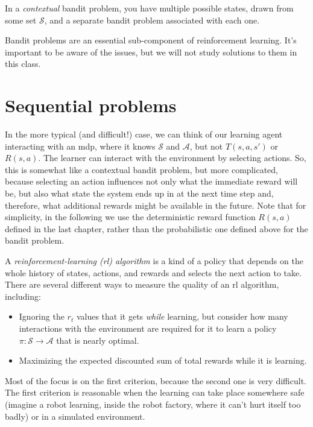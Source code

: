 In a {\em contextual} bandit problem, you have multiple possible
states, drawn from some set $\mathcal S$, and a separate bandit
problem associated with each one.

Bandit problems are an essential sub-component of reinforcement
learning.  It's important to be aware of the issues, but we will not
study solutions to them in this class.

\section{Sequential problems}
\label{rl}
In the more typical (and difficult!) case, we can think of our
learning agent interacting with an {\sc mdp}, where it knows $\mathcal
S$ and $\mathcal A$, but not $T(s,a,s')$ or $R(s,a)$.  The learner can
interact with the environment by selecting actions.  So, this is
somewhat like a contextual bandit problem, but more complicated,
because selecting an action influences not only what the immediate
reward will be, but also what state the system ends up in at the next
time step and, therefore, what additional rewards might be available
in the future.  Note that for simplicity, in the following we use the
deterministic reward function $R(s,a)$ defined in the last chapter,
rather than the probabilistic one defined above for the bandit problem.

A {\em reinforcement-learning ({\sc rl}) algorithm} is a kind of a policy that
depends on the whole history of states, actions, and rewards and
selects the next action to take.  There are several different ways to
measure the quality of an {\sc rl} algorithm, including:
\begin{itemize}
  \item Ignoring the $r_t$ values that it gets {\em while} learning,
    but consider how many interactions with the environment are
    required for it to learn a policy $\pi: \mathcal{S} \rightarrow 
    \mathcal{A}$ that is nearly optimal.
  \item Maximizing the expected discounted sum of total rewards while
    it is learning.
\end{itemize}
Most of the focus is on the first criterion, because the second one is
very difficult.  The first criterion is reasonable when the
learning can take place somewhere safe (imagine a robot learning,
inside the robot factory, where it can't hurt itself too badly) or in
a simulated environment.

